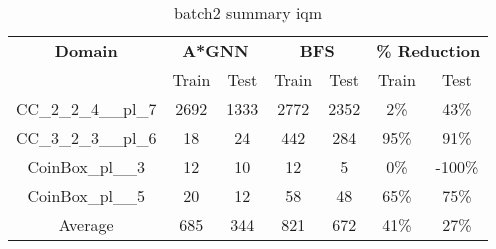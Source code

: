 \begin{table}[!ht]
  \small
  \centering
  \begin{tabular}{c|cc|cc|cc}
    \textbf{Domain}
      & \multicolumn{2}{c|}{\textbf{A*GNN}}
      & \multicolumn{2}{c|}{\textbf{BFS}}
      & \multicolumn{2}{c}{\textbf{\% Reduction}} \\
    \cline{2-7}
    & Train & Test & Train & Test & Train & Test \\
    \hline

    CC\_2\_2\_4\_\_pl\_7 & 2692 & 1333 & 2772 & 2352 & 2\% & 43\% \\
    CC\_3\_2\_3\_\_pl\_6 & 18 & 24 & 442 & 284 & 95\% & 91\% \\
    CoinBox\_pl\_\_3 & 12 & 10 & 12 & 5 & 0\% & -100\% \\
    CoinBox\_pl\_\_5 & 20 & 12 & 58 & 48 & 65\% & 75\% \\
    \hline
    Average & 685 & 344 & 821 & 672 & 41\% & 27\% \\

  \end{tabular}
  \caption{batch2 summary iqm}
  \label{tab:batch2_res}
\end{table}
